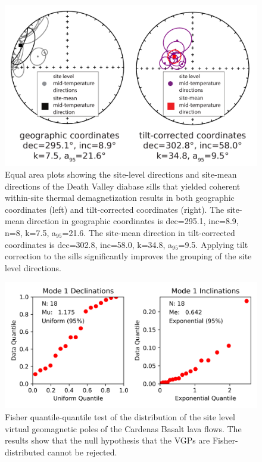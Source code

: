 \begin{figure}
\noindent\includegraphics[width=5.8 in]{figure/Zhang2024b/SI_tilt_test.pdf}
\caption[Death Valley diabase sill paleomagnetic tilt test]{Equal area plots showing the site-level directions and site-mean directions of the Death Valley diabase sills that yielded coherent within-site thermal demagnetization results in both geographic coordinates (left) and tilt-corrected coordinates (right). The site-mean direction in geographic coordinates is dec=295.1\textdegree, inc=8.9\textdegree, n=8, k=7.5, a$_{95}$=21.6\textdegree. The site-mean direction in tilt-corrected coordinates is dec=302.8\textdegree, inc=58.0\textdegree, k=34.8, a$_{95}$=9.5\textdegree. Applying tilt correction to the sills significantly improves the grouping of the site level directions. }
\label{fig:DV_tilt_test}
\end{figure}

\begin{figure}
\noindent\includegraphics[width=5.8 in]{figure/Zhang2024b/SI_Cardenas_QQ.png}
\caption[Cardenas Basalt VGPs Fisher distribution test]{Fisher quantile-quantile \cite{Fisher1987a} test of the distribution of the site level virtual geomagnetic poles of the Cardenas Basalt lava flows. The results show that the null hypothesis that the VGPs are Fisher-distributed cannot be rejected.}
\label{fig:Cardenas_QQ}
\end{figure}

